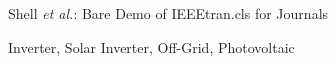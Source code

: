 \documentclass[journal]{IEEEtran}
\begin{document}
					      {Shell \MakeLowercase{\textit{et al.}}: Bare Demo of IEEEtran.cls for Journals}











					      \maketitle


					      \begin{abstract}
					      \blindtext[1]
					      \end{abstract}

					      \begin{IEEEkeywords}
					      Inverter, Solar Inverter, Off-Grid, Photovoltaic
					      \end{IEEEkeywords}

					      \IEEEpeerreviewmaketitle
\end{document}
